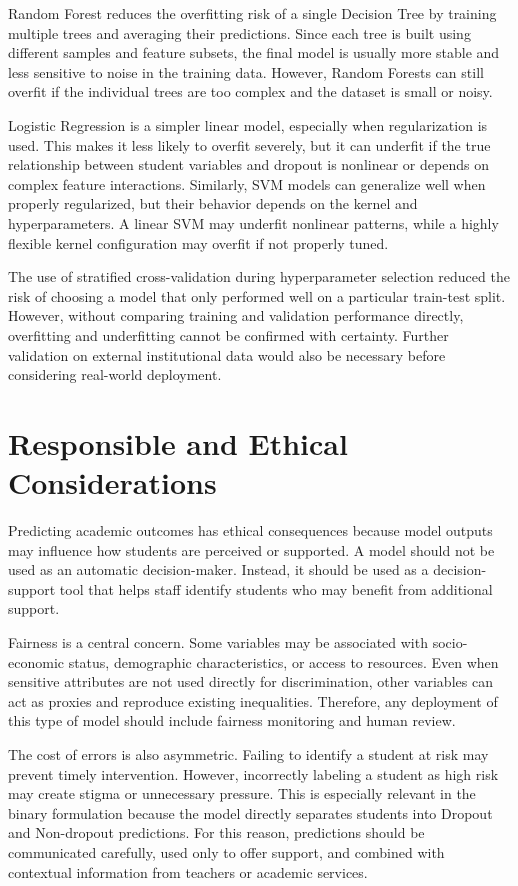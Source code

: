 \documentclass[lettersize,journal]{IEEEtran}
\begin{document}
Random Forest reduces the overfitting risk of a single Decision Tree by training multiple trees and averaging their predictions. Since each tree is built 
using different samples and feature subsets, the final model is usually more stable and less sensitive to noise in the training data. However, Random 
Forests can still overfit if the individual trees are too complex and the dataset is small or noisy.

Logistic Regression is a simpler linear model, especially when regularization is used. This makes it less likely to overfit severely, but it can underfit 
if the true relationship between student variables and dropout is nonlinear or depends on complex feature interactions. Similarly, SVM models can 
generalize well when properly regularized, but their behavior depends on the kernel and hyperparameters. A linear SVM may underfit nonlinear patterns, 
while a highly flexible kernel configuration may overfit if not properly tuned.

The use of stratified cross-validation during hyperparameter selection reduced the risk of choosing a model that only performed well on a particular train-test split. 
However, without comparing training and validation performance directly, overfitting and underfitting cannot be confirmed with certainty. 
Further validation on external institutional data would also be necessary before considering real-world deployment.

\section{Responsible and Ethical Considerations}
Predicting academic outcomes has ethical consequences because model outputs may influence how students are perceived or supported. A model should not be used as an automatic decision-maker. Instead, it should be used as a decision-support tool that helps staff identify students who may benefit from additional support.

Fairness is a central concern. Some variables may be associated with socio-economic status, demographic characteristics, or access to resources. Even when sensitive attributes are not used directly for discrimination, other variables can act as proxies and reproduce existing inequalities. Therefore, any deployment of this type of model should include fairness monitoring and human review.

The cost of errors is also asymmetric. Failing to identify a student at risk may prevent timely intervention. However, incorrectly labeling a student as high risk may create stigma or unnecessary pressure. This is especially relevant in the binary formulation because the model directly separates students into Dropout and Non-dropout predictions. For this reason, predictions should be communicated carefully, used only to offer support, and combined with contextual information from teachers or academic services.
\end{document}
